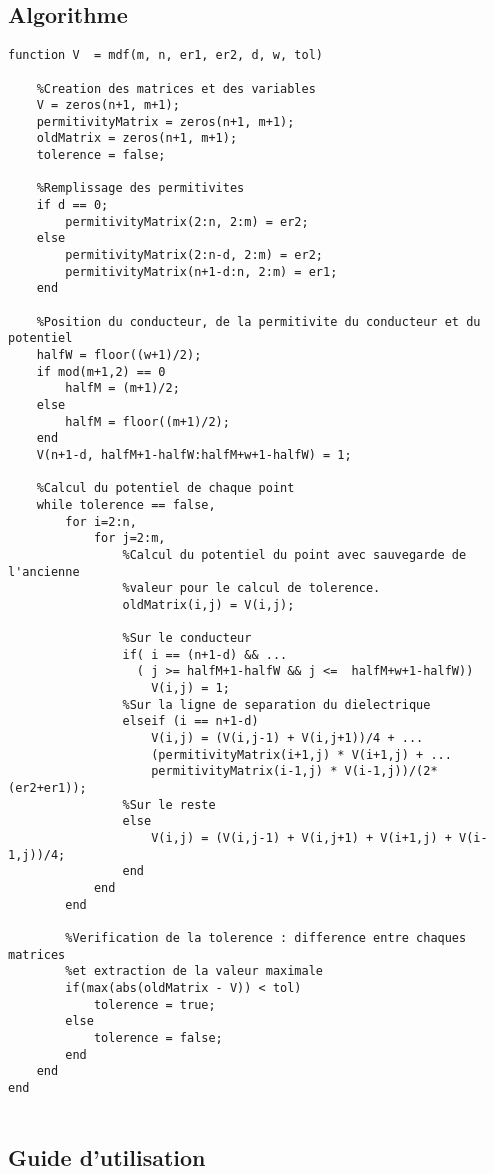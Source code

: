 \subsection{Algorithme}
\begin{lstlisting}
function V  = mdf(m, n, er1, er2, d, w, tol)
    
    %Creation des matrices et des variables
    V = zeros(n+1, m+1);
    permitivityMatrix = zeros(n+1, m+1);
    oldMatrix = zeros(n+1, m+1);
    tolerence = false;
    
    %Remplissage des permitivites
    if d == 0; 
        permitivityMatrix(2:n, 2:m) = er2;
    else
        permitivityMatrix(2:n-d, 2:m) = er2;
        permitivityMatrix(n+1-d:n, 2:m) = er1;
    end
    
    %Position du conducteur, de la permitivite du conducteur et du potentiel
    halfW = floor((w+1)/2);
    if mod(m+1,2) == 0
        halfM = (m+1)/2;
    else
        halfM = floor((m+1)/2);
    end    
    V(n+1-d, halfM+1-halfW:halfM+w+1-halfW) = 1;
    
    %Calcul du potentiel de chaque point
    while tolerence == false,
        for i=2:n,
            for j=2:m,
                %Calcul du potentiel du point avec sauvegarde de l'ancienne
                %valeur pour le calcul de tolerence.
                oldMatrix(i,j) = V(i,j);
                
                %Sur le conducteur
                if( i == (n+1-d) && ...
                  ( j >= halfM+1-halfW && j <=  halfM+w+1-halfW))
                    V(i,j) = 1;
                %Sur la ligne de separation du dielectrique
                elseif (i == n+1-d)
                    V(i,j) = (V(i,j-1) + V(i,j+1))/4 + ...
                    (permitivityMatrix(i+1,j) * V(i+1,j) + ...
                    permitivityMatrix(i-1,j) * V(i-1,j))/(2*(er2+er1));
                %Sur le reste
                else
                    V(i,j) = (V(i,j-1) + V(i,j+1) + V(i+1,j) + V(i-1,j))/4;
                end              
            end
        end
        
        %Verification de la tolerence : difference entre chaques matrices
        %et extraction de la valeur maximale
        if(max(abs(oldMatrix - V)) < tol)
            tolerence = true;
        else
            tolerence = false;
        end
    end
end


\end{lstlisting}

\subsection{Guide d'utilisation}

